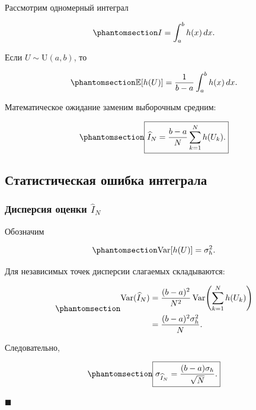 \documentclass[
  russian,
  11pt,
  a4paper,
  open=any]{scrbook}
\begin{document}
Рассмотрим одномерный интеграл

\begin{equation}\protect\phantomsection\label{eq-ch8-integral-definition}{
I=\int_a^b h(x)\,dx.
}\end{equation}

Если \(U\sim\mathrm U(a,b)\), то

\begin{equation}\protect\phantomsection\label{eq-ch8-uniform-integral-expectation}{
\mathbb E[h(U)]
=\frac{1}{b-a}\int_a^b h(x)\,dx.
}\end{equation}

Математическое ожидание заменим выборочным средним:

\begin{equation}\protect\phantomsection\label{eq-ch8-monte-carlo-integral-estimator}{
\boxed{
\widehat I_N
=\frac{b-a}{N}\sum_{k=1}^{N}h(U_k).
}
}\end{equation}

\subsection{Статистическая ошибка
интеграла}\label{ux441ux442ux430ux442ux438ux441ux442ux438ux447ux435ux441ux43aux430ux44f-ux43eux448ux438ux431ux43aux430-ux438ux43dux442ux435ux433ux440ux430ux43bux430}

\begin{bookderivation}

\subsubsection{\texorpdfstring{Дисперсия оценки
\(\widehat I_N\)}{Дисперсия оценки \textbackslash widehat I\_N}}\label{ux434ux438ux441ux43fux435ux440ux441ux438ux44f-ux43eux446ux435ux43dux43aux438-widehat-i_n}

Обозначим

\begin{equation}\protect\phantomsection\label{eq-ch8-integrand-variance}{
\operatorname{Var}[h(U)]=\sigma_h^2.
}\end{equation}

Для независимых точек дисперсии слагаемых складываются:

\begin{equation}\protect\phantomsection\label{eq-ch8-monte-carlo-integral-variance}{
\begin{aligned}
\operatorname{Var}(\widehat I_N)
&=\frac{(b-a)^2}{N^2}
  \operatorname{Var}\!\left(\sum_{k=1}^{N}h(U_k)\right)\\
&=\frac{(b-a)^2\sigma_h^2}{N}.
\end{aligned}
}\end{equation}

Следовательно,

\begin{equation}\protect\phantomsection\label{eq-ch8-monte-carlo-integral-error}{
\boxed{
\sigma_{\widehat I_N}
=\frac{(b-a)\sigma_h}{\sqrt N}.
}
}\end{equation}

\(\blacksquare\)

\end{bookderivation}
\end{document}
